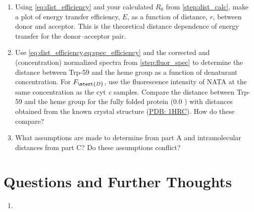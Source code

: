 \begin{enumerate}
	\item Using \cref{eq:dist_efficiency} and your calculated \( R_0 \) from \cref{step:dist_calc}, make a plot of energy transfer efficiency, \( E \), as a function of distance, \( r \), between donor and acceptor. 
	This is the theoretical distance dependence of energy transfer for the donor--acceptor pair. 
	\item Use \cref{eq:dist_efficiency,eq:spec_efficiency} and the corrected and (concentration) normalized spectra from \cref{step:fluor_spec} to determine the distance between Trp-59 and the heme group as a function of denaturant concentration. 
	For \( F_\mtext{D} \), use the fluorescence intensity of NATA at the same concentration as the cyt \emph{c} samples. 
	Compare the distance between Trp-59 and the heme group for the fully folded protein (\SI{0.0}{\Molar} ) with distances obtained from the known crystal structure (\href{https://www.rcsb.org/structure/1hrc}{PDB: 1HRC}). 
	How do these compare?
	\item What assumptions are made to determine \gibbs*[subscript-right=\ch{H2O}]{} from part A and intramolecular distances from part C\@? 
	Do these assumptions conflict?
\end{enumerate}


\section{Questions and Further Thoughts} %
\label{sec:questions_and_further_thoughts}

\begin{enumerate}
	\item 
\end{enumerate}


\nocite{*}
\printbibliography[category=cited]%

\printbibliography[%
  title={Further Reading},%
  resetnumbers,%
  omitnumbers,%
	notcategory=cited,%
	]
	
